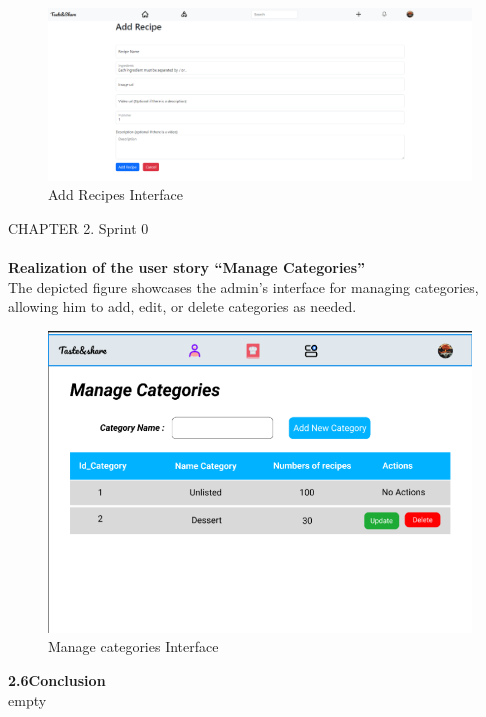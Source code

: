 \documentclass{article}
\begin{document}
{{{\begin{figure}[htbp]
    \centering
    \includegraphics[width=1\textwidth]{addpic}
    \caption{Add Recipes Interface}
    \label{fig:design2}
\end{figure}
\newpage
\noindent
CHAPTER 2.  Sprint 0 \\
\underline{\hspace{\textwidth}} \vspace{0.2cm}\\

\textbf{Realization of the user story “Manage Categories”}\\
The depicted figure showcases the admin's interface for managing categories, allowing him to add, edit, or delete categories as needed.\\

\begin{figure}[htbp]
    \centering
    \includegraphics[width=1\textwidth]{mapic}
    \caption{Manage categories Interface}
    \label{fig:design2}
\end{figure}
 {\Large \textbf{2.6\hspace{1em}Conclusion}}\vspace{0.2cm}\\
empty

}}}
\end{document}
